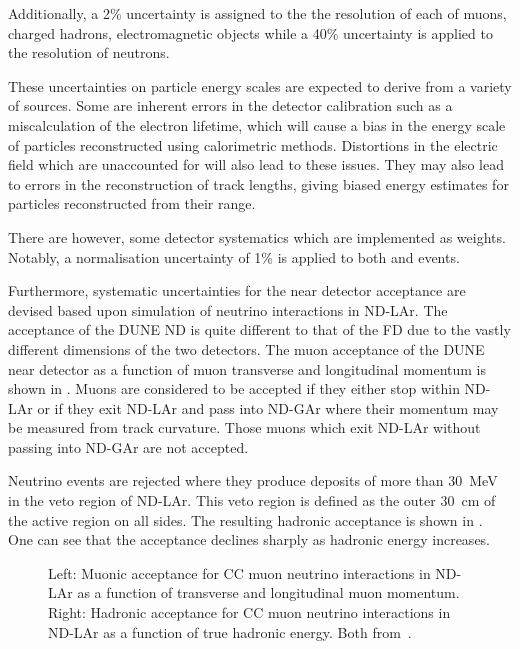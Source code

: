 Additionally, a 2\% uncertainty is assigned to the the resolution of each of muons, charged hadrons, electromagnetic objects while a 40\% uncertainty is applied to the resolution of neutrons.

These uncertainties on particle energy scales are expected to derive from a variety of sources.
Some are inherent errors in the detector calibration such as a miscalculation of the electron lifetime, which will cause a bias in the energy scale of particles reconstructed using calorimetric methods.
Distortions in the electric field which are unaccounted for will also lead to these issues. 
They may also lead to errors in the reconstruction of track lengths, giving biased energy estimates for particles reconstructed from their range.

There are however, some detector systematics which are implemented as weights. 
Notably, a normalisation uncertainty of 1\% is applied to both \numu and \nue events.

Furthermore, systematic uncertainties for the near detector acceptance are devised based upon simulation of neutrino interactions in ND-LAr.
The acceptance of the DUNE ND is quite different to that of the FD due to the vastly different dimensions of the two detectors.
The muon acceptance of the DUNE near detector as a function of muon transverse and longitudinal momentum is shown in . 
Muons are considered to be accepted if they either stop within ND-LAr or if they exit ND-LAr and pass into ND-GAr where their momentum may be measured from track curvature.
Those muons which exit ND-LAr without passing into ND-GAr are not accepted.

Neutrino events are rejected where they produce deposits of more than \SI{30}{\MeV} in the veto region of ND-LAr.
This veto region is defined as the outer \SI{30}{\cm} of the active region on all sides.
The resulting hadronic acceptance is shown in .
One can see that the acceptance declines sharply as hadronic energy increases.

\begin{figure}[h]
	\begin{minipage}[t]{.5\textwidth}
		\begin{adjustbox}{max totalsize=\linewidth, center}
			
		\end{adjustbox}
	\end{minipage}
	\hfill
	\begin{minipage}[t]{.5\textwidth}
		\begin{adjustbox}{max totalsize=\linewidth, center}
			
		\end{adjustbox}
	\end{minipage}
	\caption[Muonic and hadronic acceptance for CC neutrino interactions in ND-LAr]{Left: Muonic acceptance for CC muon neutrino interactions in ND-LAr as a function of transverse and longitudinal muon momentum. Right: Hadronic acceptance for CC muon neutrino interactions in ND-LAr as a function of true hadronic energy. Both from~\cite{Abi:2020qib}.}
	\label{fig:ndAcceptance}
\end{figure}

